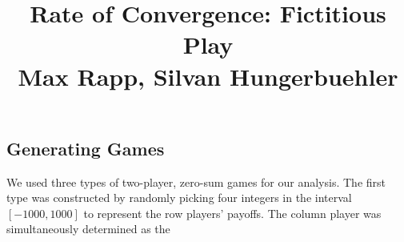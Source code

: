\documentclass[10pt,a4paper]{article}
\title{%
  Rate of Convergence: Fictitious Play \\
  \large Max Rapp, Silvan Hungerbuehler}
\date{}
\begin{document}
\maketitle

\subsection*{Generating Games}
We used three types of two-player, zero-sum games for our analysis. The first type was constructed by randomly picking four integers in the interval $[-1000,1000]$ to represent the row players' payoffs. The column player was simultaneously determined as the 
\end{document}
